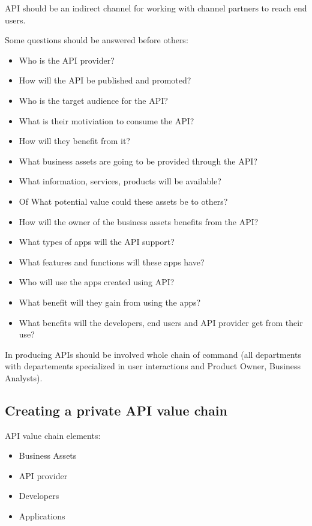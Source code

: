 \documentclass[11pt,a4paper]{article}
\begin{document}
API should be an indirect channel for working with channel partners to reach end users.

Some questions should be answered before others:
\begin{itemize}
	\item Who is the API provider?
	\item How will the API be published and promoted?
	\item Who is the target audience for the API?
	\item What is their motiviation to consume the API?
	\item How will they benefit from it?
	\item What business assets are going to be provided through the API?
	\item What information, services, products will be available?
	\item Of What potential value could these assets be to others?
	\item How will the owner of the business assets benefits from the API?
	\item What types of apps will the API support?
	\item What features and functions will these apps have?
	\item Who will use the apps created using API?
	\item What benefit will they gain from using the apps?
	\item What benefits will the developers, end users and API provider get from their use?
\end{itemize}

In producing APIs should be involved whole chain of command (all departments with departements specialized in user interactions and Product Owner, Business Analysts).

\subsection{Creating a private API value chain}

API value chain elements:
\begin{itemize}
	\item Business Assets
	\item API provider
	\item Developers
	\item Applications
\end{itemize}
\end{document}
